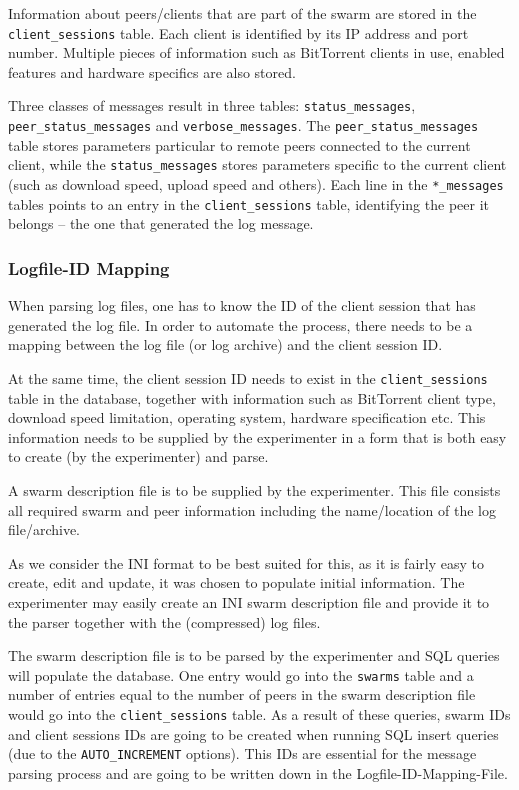 Information about peers/clients that are part of the swarm are stored in the
\texttt{client\_sessions} table. Each client is identified by its IP address
and port number. Multiple pieces of information such as BitTorrent clients in
use, enabled features and hardware specifics are also stored.

Three classes of messages result in three tables:
\texttt{status\_messages}, \texttt{peer\_status\_messages} and
\texttt{verbose\_messages}. The \texttt{peer\_status\_messages} table stores
parameters particular to remote peers connected to the current client, while
the \texttt{status\_messages} stores parameters specific to the current client
(such as download speed, upload speed and others). Each line in the
\texttt{*\_messages} tables points to an entry in the
\texttt{client\_sessions} table, identifying the peer it belongs -- the one
that generated the log message.

\subsubsection{Logfile-ID Mapping}

When parsing log files, one has to know the ID of the client session that has
generated the log file. In order to automate the process, there needs to be a
mapping between the log file (or log archive) and the client session ID.

At the same time, the client session ID needs to exist in the
\texttt{client\_sessions} table in the database, together with information
such as BitTorrent client type, download speed limitation, operating system,
hardware specification etc. This information needs to be supplied by the
experimenter in a form that is both easy to create (by the experimenter) and
parse.

A swarm description file is to be supplied by the experimenter. This file
consists all required swarm and peer information including the name/location
of the log file/archive.

As we consider the INI format to be best suited for this, as it is fairly easy
to create, edit and update, it was chosen to populate initial information. The
experimenter may easily create an INI swarm description file and provide it to
the parser together with the (compressed) log files.

The swarm description file is to be parsed by the experimenter and SQL queries
will populate the database. One entry would go into the \texttt{swarms} table
and a number of entries equal to the number of peers in the swarm description
file would go into the \texttt{client\_sessions} table. As a result of these
queries, swarm IDs and client sessions IDs are going to be created when
running SQL insert queries (due to the \texttt{AUTO\_INCREMENT} options). This
IDs are essential for the message parsing process and are going to be written
down in the Logfile-ID-Mapping-File.

